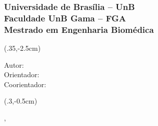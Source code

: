 






\def \L {2.}


    
    \begin{frame}
        \frametitle{\tiny  \textbf{
            Universidade de Brasília – UnB\\Faculdade UnB Gama – FGA\\
            \vspace{0.8mm} Mestrado em Engenharia Biomédica\\ \qquad
            }}
        \titlepage
        
        \begin{textblock*}{100mm}(.35\textwidth,-2.5cm)
            \begin{flushright}
                \footnotesize
                Autor: \imprimirAutor\\
                Orientador: \imprimirOrientador\\
                Coorientador: \imprimirCoorientador
            \end{flushright}
        \end{textblock*}

        \begin{textblock*}{50mm}(.3\textwidth,-0.5cm)
            \begin{center}
                \footnotesize
                \imprimirLocal, \imprimirData\\
                \imprimirInstituicao
            \end{center}
        \end{textblock*}

    \end{frame}
    
